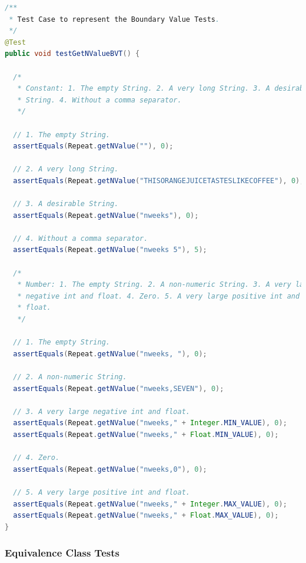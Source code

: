 \begin{lstlisting}[language=Java]
/**
 * Test Case to represent the Boundary Value Tests.
 */
@Test
public void testGetNValueBVT() {

  /*
   * Constant: 1. The empty String. 2. A very long String. 3. A desirable
   * String. 4. Without a comma separator.
   */

  // 1. The empty String.
  assertEquals(Repeat.getNValue(""), 0);

  // 2. A very long String.
  assertEquals(Repeat.getNValue("THISORANGEJUICETASTESLIKECOFFEE"), 0);

  // 3. A desirable String.
  assertEquals(Repeat.getNValue("nweeks"), 0);

  // 4. Without a comma separator.
  assertEquals(Repeat.getNValue("nweeks 5"), 5);

  /*
   * Number: 1. The empty String. 2. A non-numeric String. 3. A very large
   * negative int and float. 4. Zero. 5. A very large positive int and
   * float.
   */

  // 1. The empty String.
  assertEquals(Repeat.getNValue("nweeks, "), 0);

  // 2. A non-numeric String.
  assertEquals(Repeat.getNValue("nweeks,SEVEN"), 0);

  // 3. A very large negative int and float.
  assertEquals(Repeat.getNValue("nweeks," + Integer.MIN_VALUE), 0);
  assertEquals(Repeat.getNValue("nweeks," + Float.MIN_VALUE), 0);

  // 4. Zero.
  assertEquals(Repeat.getNValue("nweeks,0"), 0);

  // 5. A very large positive int and float.
  assertEquals(Repeat.getNValue("nweeks," + Integer.MAX_VALUE), 0);
  assertEquals(Repeat.getNValue("nweeks," + Float.MAX_VALUE), 0);
}
\end{lstlisting}

\subsubsection{Equivalence Class Tests}\label{equivalence-class-tests}

